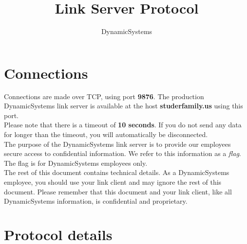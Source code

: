 \documentclass{report}
\title{Link Server Protocol}
\author{DynamicSystems}
\date{}
\newcommand{\companyName}{DynamicSystems\texttrademark}
\newcommand{\challengeHost}{studerfamily.us}
\newcommand{\challengePort}{9876}
\begin{document}
\maketitle

\setcounter{tocdepth}{3}
\tableofcontents
\newpage

\chapter{Connections}
Connections are made over TCP, using port \textbf{\challengePort{}}.
The production \companyName{} link server is available at the host \textbf{\challengeHost{}} using this port. \\

Please note that there is a timeout of \textbf{10 seconds}. If you do not send any data for longer than the timeout, you will automatically be disconnected. \\

The purpose of the \companyName{} link server is to provide our employees secure access to confidential information.
We refer to this information as a \emph{flag}. The flag is for \companyName{} employees only. \\

The rest of this document contains technical details.
As a \companyName{} employee, you should use your link client and may ignore the rest of this document.
Please remember that this document and your link client, like all \companyName{} information, is confidential and proprietary.

\chapter{Protocol details}
\end{document}
